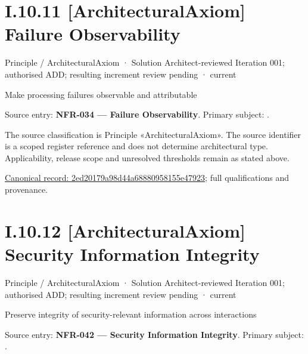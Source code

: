 \section*{I.10.11 [ArchitecturalAxiom] Failure Observability}
\label{navigation:I.10.11}

\label{element:2ed20179a98d44a68880958155e47923}
{\small Principle / ArchitecturalAxiom · Solution Architect-reviewed Iteration 001; authorised ADD; resulting increment review pending · current}\par

Make processing failures observable and attributable



Source entry: \textbf{NFR-034 — Failure Observability}. Primary subject: \texttt{}.



The source classification is Principle «ArchitecturalAxiom». The source identifier is a scoped register reference and does not determine architectural type. Applicability, release scope and unresolved thresholds remain as stated above.


{\footnotesize \href{../../../../../../../../continuum/motivation/principle/architectural-axiom/2ed20179a98d44a68880958155e47923.md}{Canonical record: 2ed20179a98d44a68880958155e47923}; full qualifications and provenance.}\par
\section*{I.10.12 [ArchitecturalAxiom] Security Information Integrity}
\label{navigation:I.10.12}

\label{element:52083b57c01d4262bf965afa96489136}
{\small Principle / ArchitecturalAxiom · Solution Architect-reviewed Iteration 001; authorised ADD; resulting increment review pending · current}\par

Preserve integrity of security-relevant information across interactions



Source entry: \textbf{NFR-042 — Security Information Integrity}. Primary subject: \texttt{}.




